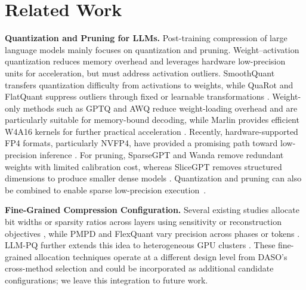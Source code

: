 \documentclass[letterpaper]{article} %
\begin{document}
\section{Related Work}
\textbf{Quantization and Pruning for LLMs. }Post-training compression of large language models mainly focuses on quantization and pruning. Weight–activation quantization reduces memory overhead and leverages hardware low-precision units for acceleration, but must address activation outliers. SmoothQuant transfers quantization difficulty from activations to weights, while QuaRot and FlatQuant suppress outliers through fixed or learnable transformations \cite{xiao2023smoothquant,ashkboos2024quarot,sun2025flatquant}. Weight-only methods such as GPTQ and AWQ reduce weight-loading overhead and are particularly suitable for memory-bound decoding, while Marlin provides efficient W4A16 kernels for further practical acceleration \cite{frantar2023gptq,lin2024awq,frantar2025marlin}. Recently, hardware-supported FP4 formats, particularly NVFP4, have provided a promising path toward low-precision inference \cite{alvarez2025nvfp4}. For pruning, SparseGPT and Wanda remove redundant weights with limited calibration cost, whereas SliceGPT removes structured dimensions to produce smaller dense models \cite{frantar2023sparsegpt,sun2024wanda,ashkboos2024slicegpt}. Quantization and pruning can also be combined to enable sparse low-precision execution~\cite{guo2024jsq}.


\textbf{Fine-Grained Compression Configuration.}
Several existing studies allocate bit widths or sparsity ratios across layers using sensitivity or reconstruction objectives \cite{guan2024aptq,huang2025slimllm,yin2024owl,xu2024besa}, while PMPD and FlexQuant vary precision across phases or tokens \cite{chen2025pmpd,liu2025flexquant}. LLM-PQ further extends this idea to heterogeneous GPU clusters \cite{zhao2024llmpq}. These fine-grained allocation techniques operate at a different design level from DASO's cross-method selection and could be incorporated as additional candidate configurations; we leave this integration to future work.
\end{document}
